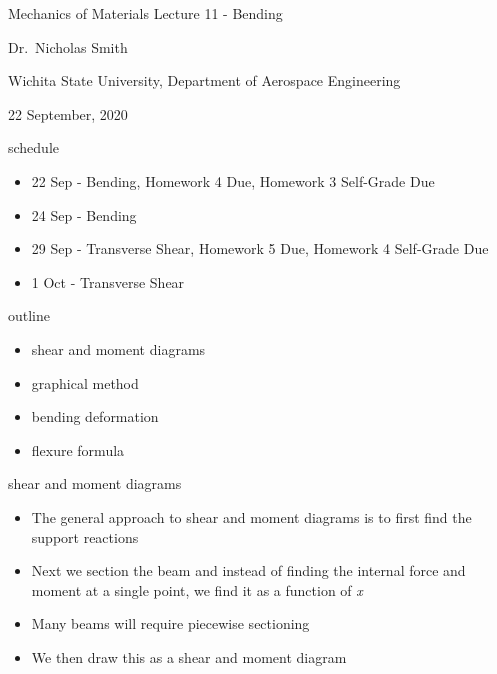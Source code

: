 \begin{frame}{Mechanics of Materials}
\protect\hypertarget{mechanics-of-materials}{}
Lecture 11 - Bending

Dr.~Nicholas Smith

Wichita State University, Department of Aerospace Engineering

22 September, 2020
\end{frame}

\begin{frame}{schedule}
\protect\hypertarget{schedule}{}
\begin{itemize}
\tightlist
\item
  22 Sep - Bending, Homework 4 Due, Homework 3 Self-Grade Due
\item
  24 Sep - Bending
\item
  29 Sep - Transverse Shear, Homework 5 Due, Homework 4 Self-Grade Due
\item
  1 Oct - Transverse Shear
\end{itemize}
\end{frame}

\begin{frame}{outline}
\protect\hypertarget{outline}{}
\begin{itemize}
\tightlist
\item
  shear and moment diagrams
\item
  graphical method
\item
  bending deformation
\item
  flexure formula
\end{itemize}
\end{frame}

\begin{frame}{shear and moment diagrams}
\protect\hypertarget{shear-and-moment-diagrams}{}
\begin{itemize}
\tightlist
\item
  The general approach to shear and moment diagrams is to first find the
  support reactions
\item
  Next we section the beam and instead of finding the internal force and
  moment at a single point, we find it as a function of \emph{x}
\item
  Many beams will require piecewise sectioning
\item
  We then draw this as a shear and moment diagram
\end{itemize}
\end{frame}

